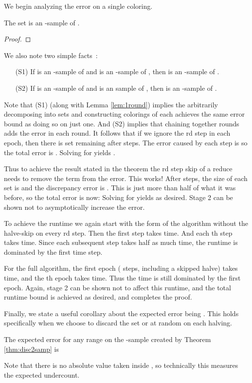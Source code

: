 \documentclass[11pt]{myclass}
\begin{document}
We begin analyzing the error on a single coloring.  
\begin{lemma}
The set  is an -sample of .  
\label{lem:1round}
\end{lemma}
\begin{proof}

\end{proof}
We also note two simple facts~\cite{Cha01,Mat99}:
\begin{itemize}
\item[(S1)] If  is an -sample of  and  is an -sample of , then  is an -sample of .  
\item[(S2)] If  is an -sample of  and  is an  sample of , then  is an -sample of .  
\end{itemize}
Note that (S1) (along with Lemma \ref{lem:1round}) implies the arbitrarily decomposing  into  sets and constructing colorings of each achieves the same error bound as doing so on just one.  And (S2) implies that chaining together rounds adds the error in each round.  
It follows that if we ignore the rd step in each epoch, then there is  set remaining after  steps.  The error caused by each step is  so the total error is .  Solving for  yields
.  

Thus to achieve the result stated in the theorem the rd step skip of a reduce needs to remove the  term from the error.  This works!  After  steps, the size of each set is  and the discrepancy error is .  This is just more than half of what it was before, so the total error is now:
  Solving for  yields  as desired.  
Stage 2 can be shown not to asymptotically increase the error.  

To achieve the runtime we again start with the form of the algorithm without the halve-skip on every rd step.  Then the first step takes  time.  And each th step takes  time.  Since each subsequent step takes half as much time, the runtime is dominated by the first  time step.  

For the full algorithm, the first epoch ( steps, including a skipped halve) takes  time, and the th epoch takes  time.  Thus the time is still dominated by the first epoch.  Again, stage 2 can be shown not to affect this runtime, and the total runtime bound is achieved as desired, and completes the proof.  

Finally, we state a useful corollary about the expected error being .  This holds specifically when we choose to discard the set  or  at random on each halving.  

\begin{corollary}
\label{cor:E0}
The expected error for any range  on the -sample  created by Theorem \ref{thm:disc2samp} is 
  
\end{corollary}
Note that there is no absolute value taken inside , so technically this measures the expected undercount. 
\end{document}
